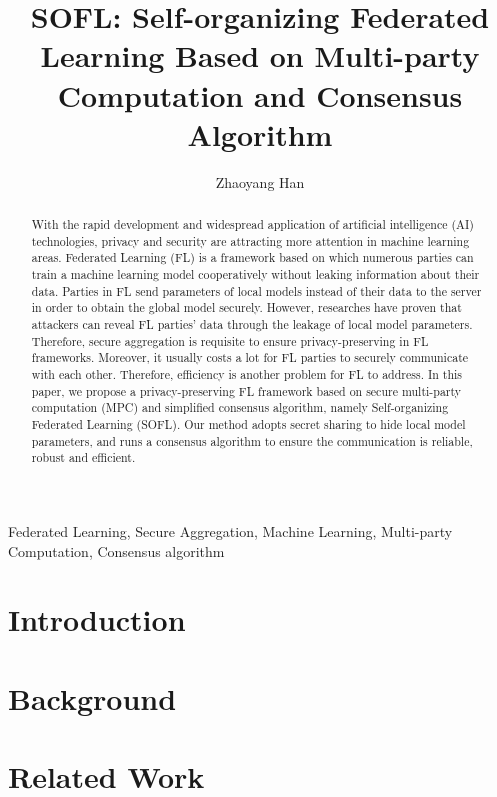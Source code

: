 \documentclass[journal]{IEEEtran}
\title {SOFL: Self-organizing Federated Learning Based on Multi-party Computation and Consensus Algorithm}
\author{Zhaoyang Han}
\begin{document}
\maketitle

\begin{abstract}
With the rapid development and widespread application of artificial intelligence (AI) technologies, privacy and security are attracting more attention in machine learning areas. Federated Learning (FL) is a framework based on which numerous parties can train a machine learning model cooperatively without leaking information about their data. Parties in FL send parameters of local models instead of their data to the server in order to obtain the global model securely. However, researches have proven that attackers can reveal FL parties' data through the leakage of local model parameters. Therefore, secure aggregation is requisite to ensure privacy-preserving in FL frameworks. Moreover, it usually costs a lot for FL parties to securely communicate with each other. Therefore, efficiency is another problem for FL to address. In this paper, we propose a privacy-preserving FL framework based on secure multi-party computation (MPC) and simplified consensus algorithm, namely Self-organizing Federated Learning (SOFL). Our method adopts secret sharing to hide local model parameters, and runs a consensus algorithm to ensure the communication is reliable, robust and efficient.

\end{abstract}

\begin{IEEEkeywords}
    Federated Learning, Secure Aggregation, Machine Learning, Multi-party Computation, Consensus algorithm
\end{IEEEkeywords}


\section{Introduction} 
\label{sec:intro}


\section{Background}
\label{sec:back}


\section{Related Work}
\label{sec:related}

\end{document}
